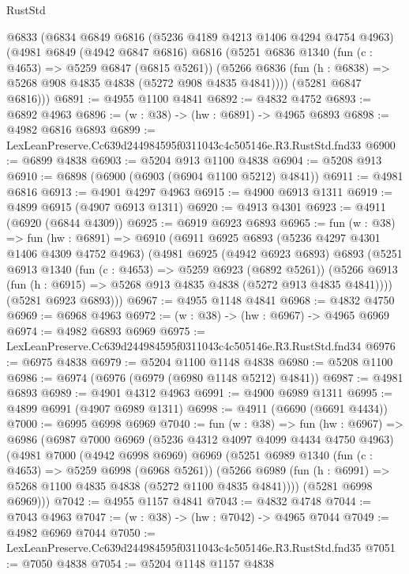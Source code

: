 \begin{lexlean}{RustStd}
\begin{coremodule}
  @6833
    (@6834
      @6849
      @6816
      (@5236 @4189 @4213 @1406 @4294 @4754 @4963)
      (@4981
        @6849
        (@4942 @6847 @6816)
        @6816
        (@5251
          @6836
          @1340
          (fun (c : @4653) => @5259 @6847 (@6815 @5261))
          (@5266 @6836 (fun (h : @6838) => @5268 @908 @4835 @4838 (@5272 @908 @4835 @4841))))
        (@5281 @6847 @6816)))
@6891 := @4955 @1100 @4841
@6892 := @4832 @4752
@6893 := @6892 @4963
@6896 := (w : @38) -> (hw : @6891) -> @4965 @6893
@6898 := @4982 @6816 @6893
@6899 := LexLeanPreserve.Cc639d244984595f0311043c4c505146e.R3.RustStd.fnd33
@6900 := @6899 @4838
@6903 := @5204 @913 @1100 @4838
@6904 := @5208 @913
@6910 := @6898 (@6900 (@6903 (@6904 @1100 @5212) @4841))
@6911 := @4981 @6816
@6913 := @4901 @4297 @4963
@6915 := @4900 @6913 @1311
@6919 := @4899 @6915 (@4907 @6913 @1311)
@6920 := @4913 @4301
@6923 := @4911 (@6920 (@6844 @4309))
@6925 := @6919 @6923 @6893
@6965 := fun (w : @38) =>
  fun (hw : @6891) =>
  @6910
    (@6911
      @6925
      @6893
      (@5236 @4297 @4301 @1406 @4309 @4752 @4963)
      (@4981
        @6925
        (@4942 @6923 @6893)
        @6893
        (@5251
          @6913
          @1340
          (fun (c : @4653) => @5259 @6923 (@6892 @5261))
          (@5266 @6913 (fun (h : @6915) => @5268 @913 @4835 @4838 (@5272 @913 @4835 @4841))))
        (@5281 @6923 @6893)))
@6967 := @4955 @1148 @4841
@6968 := @4832 @4750
@6969 := @6968 @4963
@6972 := (w : @38) -> (hw : @6967) -> @4965 @6969
@6974 := @4982 @6893 @6969
@6975 := LexLeanPreserve.Cc639d244984595f0311043c4c505146e.R3.RustStd.fnd34
@6976 := @6975 @4838
@6979 := @5204 @1100 @1148 @4838
@6980 := @5208 @1100
@6986 := @6974 (@6976 (@6979 (@6980 @1148 @5212) @4841))
@6987 := @4981 @6893
@6989 := @4901 @4312 @4963
@6991 := @4900 @6989 @1311
@6995 := @4899 @6991 (@4907 @6989 @1311)
@6998 := @4911 (@6690 (@6691 @4434))
@7000 := @6995 @6998 @6969
@7040 := fun (w : @38) =>
  fun (hw : @6967) =>
  @6986
    (@6987
      @7000
      @6969
      (@5236 @4312 @4097 @4099 @4434 @4750 @4963)
      (@4981
        @7000
        (@4942 @6998 @6969)
        @6969
        (@5251
          @6989
          @1340
          (fun (c : @4653) => @5259 @6998 (@6968 @5261))
          (@5266 @6989 (fun (h : @6991) => @5268 @1100 @4835 @4838 (@5272 @1100 @4835 @4841))))
        (@5281 @6998 @6969)))
@7042 := @4955 @1157 @4841
@7043 := @4832 @4748
@7044 := @7043 @4963
@7047 := (w : @38) -> (hw : @7042) -> @4965 @7044
@7049 := @4982 @6969 @7044
@7050 := LexLeanPreserve.Cc639d244984595f0311043c4c505146e.R3.RustStd.fnd35
@7051 := @7050 @4838
@7054 := @5204 @1148 @1157 @4838

\end{coremodule}
\end{lexlean}
